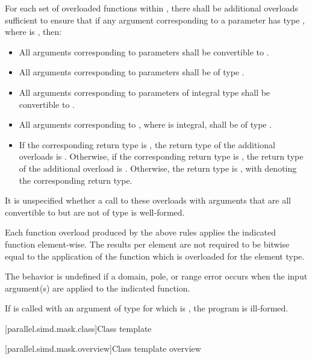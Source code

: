 \pnum
For each set of overloaded functions within , there shall be additional overloads sufficient to ensure that if any argument corresponding to a  parameter has type , where  is , then:
\begin{itemize}
  \item All arguments corresponding to  parameters shall be convertible to .
  \item All arguments corresponding to  parameters shall be of type .
  \item All arguments corresponding to parameters of integral type  shall be convertible to .
  \item All arguments corresponding to , where  is integral, shall be of type .
  \item If the corresponding return type is , the return type of the additional overloads is . Otherwise, if the corresponding return type is , the return type of the additional overload is . Otherwise, the return type is , with  denoting the corresponding return type.
\end{itemize}
It is unspecified whether a call to these overloads with arguments that are all convertible to  but are not of type  is well-formed.

\pnum
Each function overload produced by the above rules applies the indicated  function element-wise. The results per element are not required to be bitwise equal to the application of the function which is overloaded for the element type.

\pnum
The behavior is undefined if a domain, pole, or range error occurs when the input argument(s) are applied to the indicated  function.

\pnum
If  is called with an argument of type  for which  is , the program is ill-formed.

[parallel.simd.mask.class]{Class template }

[parallel.simd.mask.overview]{Class template  overview}

